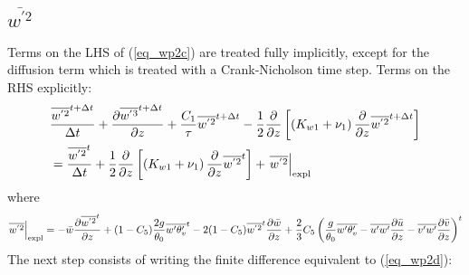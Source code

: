 \documentclass[11pt,fleqn]{article}
\newcommand{\ptlder}[2]{\frac{\partial #1}{\partial #2}}
\begin{document}
\subsection{$\overline{w^{'2}}$}

Terms on the LHS of (\ref{eq_wp2c}) are treated fully implicitly, except
for the diffusion term which is treated with a Crank-Nicholson time step.
Terms on the RHS explicitly:
%
\begin{equation}
\label{eq_wp2d}
\begin{split}
& \frac{\overline{w^{'2}}^{t+\Delta t}}{\Delta t} 
  + \ptlder{\overline{w^{'3}}^{t+\Delta t}}{z} 
  + \dfrac{C_1}{\tau} \overline{w^{'2}}^{t+\Delta t} 
  - \frac{1}{2} \ptlder{}{z} \left[ \left( K_{w1} + \nu_1 \right)
                                    \ptlder{}{z} \overline{w^{'2}}^{t+\Delta t} 
                             \right]  \\
&=
  \frac{\overline{w^{'2}}^{t}}{\Delta t} 
  + \frac{1}{2} \ptlder{}{z} \left[ \left( K_{w1} + \nu_1 \right)
                                    \ptlder{}{z} \overline{w^{'2}}^{t}
                             \right]
  + \left. \overline{w^{'2}} \right|_{\rm expl}
\end{split}
\end{equation}
%
where
%
\begin{equation}
\label{eq_wp2t}
\left. \overline{w^{'2}} \right|_{\rm expl}
= 
  - \bar{w}\ptlder{\overline{w^{'2}}^{t}}{z}	 
  + ( 1 - C_5 ) \frac{2g}{\theta_0} \overline{w'\theta'_v}^{t}
  - 2 ( 1 - C_5 ) \overline{w^{'2}}^{t}\ptlder{\bar{w}}{z}
  + \frac{2}{3} C_5
     \left(
       \frac{g}{\theta_0} \overline{w'\theta'_v}
       - \overline{u'w'}\ptlder{\bar{u}}{z} 
       - \overline{v'w'}\ptlder{\bar{v}}{z} 
     \right)^{t}
\end{equation}
%
The next step consists of writing the finite difference equivalent to
(\ref{eq_wp2d}):
%
\end{document}
